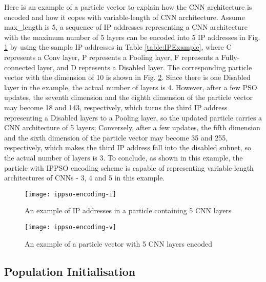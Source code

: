 \documentclass[conference]{IEEEtran}
\begin{document}
Here is an example of a particle vector to explain how the CNN architecture is encoded and how it copes with variable-length of CNN architecture. Assume max\_length is 5, a sequence of IP addresses representing a CNN architecture with the maximum number of 5 layers can be encoded into 5 IP addresses in Fig. \ref{fig:ParticleIP} by using the sample IP addresses in Table \ref{table:IPExample}, where C represents a Conv layer, P represents a Pooling layer, F represents a Fully-connected layer, and D represents a Disabled layer. The corresponding particle vector with the dimension of 10 is shown in Fig. \ref{fig:ParticleVector}. Since there is one Disabled layer in the example, the actual number of layers is 4. However, after a few PSO updates, the seventh dimension and the eighth dimension of the particle vector may become 18 and 143, respectively, which turns the third IP address representing a Disabled layers to a Pooling layer, so the updated particle carries a CNN architecture of 5 layers; Conversely, after a few updates, the fifth dimension and the sixth dimension of the particle vector may become 35 and 255, respectively, which makes the third IP address fall into the disabled subnet, so the actual number of layers is 3. To conclude, as shown in this example, the particle with IPPSO encoding scheme is capable of representing variable-length architectures of CNNs - 3, 4 and 5 in this example.


\begin{figure}[!t]
	\centering
	\texttt{[image: ippso-encoding-i]}
	\caption{An example of IP addresses in a particle containing 5 CNN layers}
	\label{fig:ParticleIP}
\end{figure}

\begin{figure}[!t]
	\centering
	\texttt{[image: ippso-encoding-v]}
	\caption{An example of a particle vector with 5 CNN layers encoded}
	\label{fig:ParticleVector}
\end{figure}

\subsection{Population Initialisation}
\end{document}
